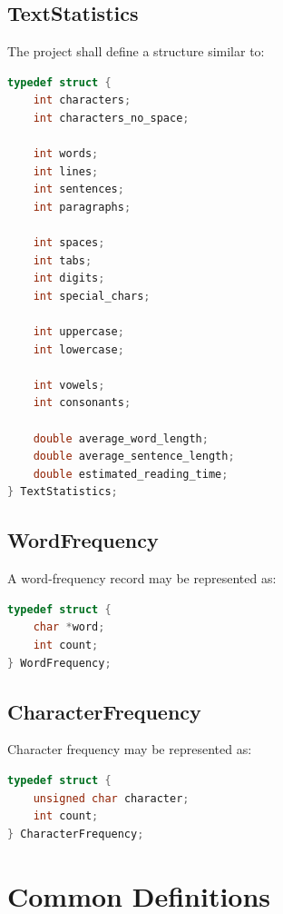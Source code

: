 \documentclass[12pt,a4paper]{article}
\begin{document}
\subsection{TextStatistics}

The project shall define a structure similar to:

\begin{lstlisting}[language=C]
typedef struct {
    int characters;
    int characters_no_space;

    int words;
    int lines;
    int sentences;
    int paragraphs;

    int spaces;
    int tabs;
    int digits;
    int special_chars;

    int uppercase;
    int lowercase;

    int vowels;
    int consonants;

    double average_word_length;
    double average_sentence_length;
    double estimated_reading_time;
} TextStatistics;
\end{lstlisting}

\subsection{WordFrequency}

A word-frequency record may be represented as:

\begin{lstlisting}[language=C]
typedef struct {
    char *word;
    int count;
} WordFrequency;
\end{lstlisting}

\subsection{CharacterFrequency}

Character frequency may be represented as:

\begin{lstlisting}[language=C]
typedef struct {
    unsigned char character;
    int count;
} CharacterFrequency;
\end{lstlisting}


\section{Common Definitions}
\end{document}
